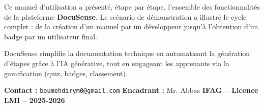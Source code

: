\documentclass[12pt, a4paper]{article}
\begin{document}
Ce manuel d'utilisation a présenté, étape par étape, l'ensemble des
fonctionnalités de la plateforme \textbf{DocuSense}. Le scénario de
démonstration a illustré le cycle complet : de la création d'un manuel
par un développeur jusqu'à l'obtention d'un badge par un utilisateur final.

DocuSense simplifie la documentation technique en automatisant la
génération d'étapes grâce à l'IA générative, tout en engageant les
apprenants via la gamification (quiz, badges, classement).

\vspace{1cm}
\begin{tcolorbox}[colback=DSlightgray, colframe=DSgray]
  \textbf{Contact :} \texttt{boumehdirym0@gmail.com} \quad
  \textbf{Encadrant :} Mr. Abbas \quad
  \textbf{IFAG -- Licence LMI -- 2025-2026}
\end{tcolorbox}
\end{document}
